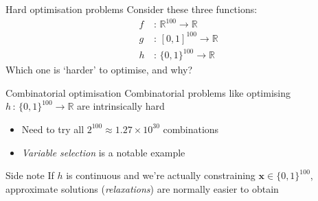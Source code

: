 \documentclass[16pt,aspectratio=169]{beamer}
\renewcommand{\vec}[1]{\ensuremath{\mathbf{#1}}}
\newcommand{\R}{\ensuremath{\mathbb{R}}}
\begin{document}
\begin{frame}{Hard optimisation problems}
    Consider these three functions:
    \begin{align*}
        f\,&:\,\R^{100} \to \R \\
        g\,&:\,[0, 1]^{100} \to \R \\
        h\,&:\,\{0, 1\}^{100} \to \R
    \end{align*}
    \vfill
    Which one is `harder' to optimise, and why?
\end{frame}

\begin{frame}{Combinatorial optimisation}
    Combinatorial problems like optimising $h\,:\,\{0, 1\}^{100} \to \R$ are
    intrinsically hard
    \begin{itemize}
        \item Need to try all $2^{100} \approx 1.27 \times 10^{30}$ combinations
        \item \emph{Variable selection} is a notable example
    \end{itemize}
    \vfill
    \begin{block}{Side note}
        If $h$ is continuous and we're actually constraining
        $\vec{x} \in \{0, 1\}^{100}$, approximate solutions (\emph{relaxations})
        are normally easier to obtain
    \end{block}
\end{frame}
\end{document}
